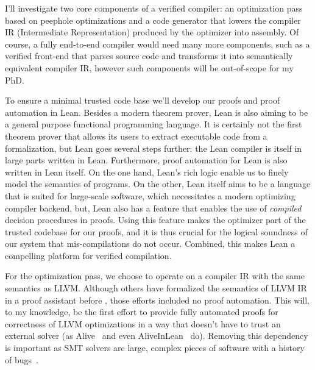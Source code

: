 \documentclass[a4paper]{scrartcl}
\begin{document}
I'll investigate two core components of a verified compiler:
an optimization pass based on peephole optimizations and a code
generator that lowers the compiler IR (Intermediate Representation)
produced by the optimizer into assembly. Of course, a fully end-to-end
compiler would need many more components, such as a verified front-end
that parses source code and transforms it into semantically equivalent
compiler IR, however such components will be out-of-scope for my PhD.

To ensure a minimal trusted code base we'll develop our proofs and proof
automation in Lean. Besides a modern theorem prover, Lean is also aiming
to be a general purpose functional programming language. It is certainly
not the first theorem prover that allows its users to extract executable
code from a formalization, but Lean goes several steps further: the Lean
compiler is itself in large parts written in Lean. Furthermore, proof
automation for Lean is also written in Lean itself. On the one hand,
Lean's rich logic enable us to finely model the semantics of programs.
On the other, Lean itself aims to be a language that is suited for
large-scale software, which necessitates a modern optimizing compiler
backend, but, Lean also has a feature that enables the use of
\emph{compiled} decision procedures in proofs. Using this feature makes
the optimizer part of the trusted codebase for our proofs, and it is
thus crucial for the logical soundness of our system that
mis-compilations do not occur. Combined, this makes Lean a compelling
platform for verified compilation.

For the optimization pass, we choose to operate on a compiler IR with the same semantics as LLVM.
Although others have formalized the semantics of LLVM IR in a proof assistant before
\cite{zhaoFormalVerificationSSABased, zakowskiModularCompositionalExecutable2021}, those efforts
included no proof automation. This will, to my knowledge, be the first
effort to provide fully automated proofs for correctness of LLVM
optimizations in a way that doesn't have to trust an external solver (as
Alive~\cite{lopesAlive2BoundedTranslation2021} and even AliveInLean~\cite{leeAliveInLeanVerifiedLLVM2019} do). Removing
this dependency is important as SMT solvers are large, complex pieces of
software with a history of bugs~\cite{brummayerFuzzingDeltadebuggingSMT2009, mansurDetectingCriticalBugs2020}.

\end{document}
